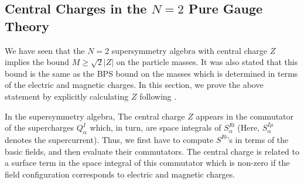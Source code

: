 \subsection{Central Charges in the $N=2$ Pure Gauge Theory}

We have seen that the $N=2$ supersymmetry algebra with central charge
$Z$ implies the bound $M\ge \sqrt{2}|Z|$ on the particle masses. It
was also stated that this bound is the same as the BPS bound on the
masses which is determined in terms of the electric and magnetic
charges. In this section, we prove the above statement by explicitly
calculating $Z$ following \cite{Olive-Witten}.  

In the supersymmetry algebra, The central charge $Z$ appears in the
commutator of the supercharges $Q^I_\alpha$ which, in turn, are space
integrals of $S^{I0}_\alpha$ (Here, $S^{I\mu}_\alpha$ denotes the
supercurrent). Thus, we first have to compute $S^{I0}$'s in terms of
the basic fields, and then evaluate their commutators. The central
charge is related to a surface term in the space integral of this
commutator which is non-zero if the field configuration corresponds to
electric and magnetic charges.
  
